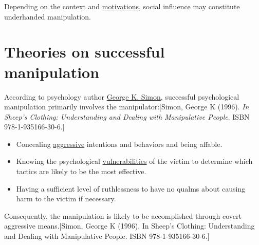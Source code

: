 \documentclass{book}
\numberwithin{equation}{section}
\begin{document}
Depending on the context and \href{https://en.wikipedia.org/wiki/Motivations}{motivations}, social influence may constitute underhanded manipulation.

\section{Theories on successful manipulation}
According to psychology author \href{https://en.wikipedia.org/wiki/George_K._Simon}{George K. Simon}, successful psychological manipulation primarily involves the manipulator:[Simon, George K (1996). \textit{In Sheep's Clothing: Understanding and Dealing with Manipulative People}. ISBN 978-1-935166-30-6.]
\begin{itemize}
    \item Concealing \href{https://en.wikipedia.org/wiki/Aggression}{aggressive} intentions and behaviors and being affable.
    \item Knowing the psychological \href{https://en.wikipedia.org/wiki/Vulnerabilities}{vulnerabilities} of the victim to determine which tactics are likely to be the most effective.
    \item Having a sufficient level of ruthlessness to have no qualms about causing harm to the victim if necessary.
\end{itemize}
Consequently, the manipulation is likely to be accomplished through covert aggressive means.[Simon, George K (1996). In Sheep's Clothing: Understanding and Dealing with Manipulative People. ISBN 978-1-935166-30-6.]
\end{document}
